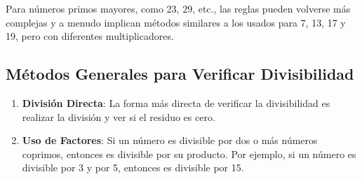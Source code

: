 Para números primos mayores, como 23, 29, etc., las reglas pueden volverse más complejas y a menudo implican métodos similares a los usados para 7, 13, 17 y 19, pero con diferentes multiplicadores.

\subsection{Métodos Generales para Verificar Divisibilidad}

\begin{enumerate}
	\item \textbf{División Directa}: La forma más directa de verificar la divisibilidad es realizar la división y ver si el residuo es cero.
	\item \textbf{Uso de Factores}: Si un número es divisible por dos o más números coprimos, entonces es divisible por su producto. Por ejemplo, si un número es divisible por 3 y por 5, entonces es divisible por 15.
\end{enumerate}
